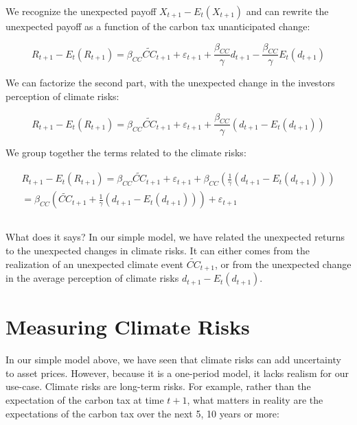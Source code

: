 We recognize the unexpected payoff $X_{t+1} - E_t(X_{t+1})$
and can rewrite the unexpected payoff as a function of the carbon tax
unanticipated change:

\begin{equation}
    R_{t+1} - E_t(R_{t+1}) = \beta_{CC} \tilde{CC}_{t+1} + \varepsilon_{t+1} + \frac{\beta_{CC}}{\gamma}d_{t+1} - \frac{\beta_{CC}}{\gamma}E_t(d_{t+1})
\end{equation}

We can factorize the second part, with
the unexpected change in the investors perception of climate risks:

\begin{equation}
    R_{t+1} - E_t(R_{t+1}) = \beta_{CC} \tilde{CC}_{t+1} + \varepsilon_{t+1} + \frac{\beta_{CC}}{\gamma}(d_{t+1} - E_t(d_{t+1}))
\end{equation}

We group together the terms related to the climate risks:

\begin{equation}
    \begin{aligned}
    R_{t+1} - E_t(R_{t+1}) = \beta_{CC} \tilde{CC}_{t+1} + \varepsilon_{t+1} + \beta_{CC} \left( \frac{1}{\gamma}(d_{t+1} - E_t(d_{t+1})) \right) \\
 = \beta_{CC} \left(\tilde{CC}_{t+1} + \frac{1}{\gamma}(d_{t+1} - E_t(d_{t+1})) \right) + \varepsilon_{t+1}
    \end{aligned}
\end{equation}

\begin{equation}
\end{equation}

What does it says? In our simple model, 
we have related the unexpected returns to the
unexpected changes in climate risks. It can 
either comes from the realization of an 
unexpected climate event $\tilde{CC}_{t+1}$,
or from the unexpected change in the average
perception of climate risks $d_{t+1} - E_t(d_{t+1})$.



\section{Measuring Climate Risks}

In our simple model above, we have seen that
climate risks can add uncertainty to asset prices.
However, because it is a one-period model,
it lacks realism for our use-case.
Climate risks are long-term risks. For example, 
rather than the expectation of the carbon tax at time $t+1$,
what matters in reality are the expectations
of the carbon tax over the next 5, 10 years or more:

